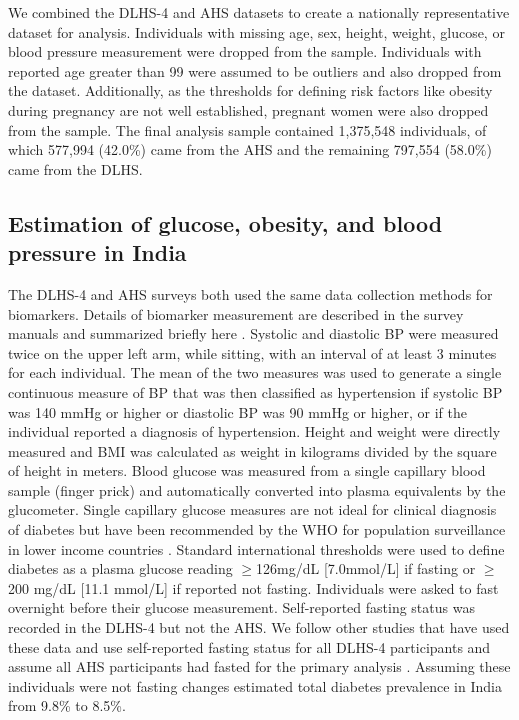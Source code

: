 \documentclass[10pt,letterpaper]{article}
\numberwithin{equation}{section}
\begin{document}
We combined the DLHS-4 and AHS datasets to create a nationally representative dataset for analysis. Individuals with missing age, sex, height, weight, glucose, or blood pressure measurement were dropped from the sample. Individuals with reported age greater than 99 were assumed to be outliers and also dropped from the dataset. Additionally, as the thresholds for defining risk factors like obesity during pregnancy are not well established, pregnant women were also dropped from the sample. The final analysis sample contained 1,375,548 individuals, of which 577,994 (42.0\%) came from the AHS and the remaining 797,554 (58.0\%) came from the DLHS.

\subsection{Estimation of glucose, obesity, and blood pressure in India}
\label{sec:glucose}
The DLHS-4 and AHS surveys both used the same data collection methods for biomarkers. Details of biomarker measurement are described in the survey manuals and summarized briefly here \cite{noauthor_annual_2014}. Systolic and diastolic BP were measured twice on the upper left arm, while sitting, with an interval of at least 3 minutes for each individual. The mean of the two measures was used to generate a single continuous measure of BP that was then classified as hypertension if systolic BP was 140 mmHg or higher or diastolic BP was 90 mmHg or higher, or if the individual reported a diagnosis of hypertension. Height and weight were directly measured and BMI was calculated as weight in kilograms divided by the square of height in meters. Blood glucose was measured from a single capillary blood sample (finger prick) and automatically converted into plasma equivalents by the glucometer. Single capillary glucose measures are not ideal for clinical diagnosis of diabetes but have been recommended by the WHO for population surveillance in lower income countries \cite{diabetesWHO}. Standard international thresholds were used to define diabetes as a plasma glucose reading $\geq$126mg/dL [7.0mmol/L] if fasting or $\geq$200 mg/dL [11.1 mmol/L] if reported not fasting. Individuals were asked to fast overnight before their glucose measurement. Self-reported fasting status was recorded in the DLHS-4 but not the AHS. We follow other studies that have used these data and use self-reported fasting status for all DLHS-4 participants and assume all AHS participants had fasted for the primary analysis \cite{geldsetzer2018,bischops2019}.  Assuming these individuals were not fasting changes estimated total diabetes prevalence in India from 9.8\% to 8.5\%.
\end{document}

